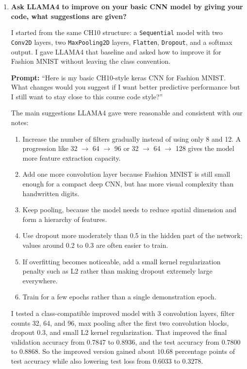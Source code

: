 \documentclass[10pt]{extarticle}
\begin{document}
\begin{enumerate}[label=\arabic*., leftmargin=2em]

\item \textbf{Ask LLAMA4 to improve on your basic CNN model by giving your code, what suggestions are given?}

I started from the same CH10 structure: a \texttt{Sequential} model with two \texttt{Conv2D} layers, two \texttt{MaxPooling2D} layers, \texttt{Flatten}, \texttt{Dropout}, and a softmax output. I gave LLAMA4 that baseline and asked how to improve it for Fashion MNIST without leaving the class convention.

\noindent\textbf{Prompt:} ``Here is my basic CH10-style keras CNN for Fashion MNIST. What changes would you suggest if I want better predictive performance but I still want to stay close to this course code style?''

The main suggestions LLAMA4 gave were reasonable and consistent with our notes:
\begin{enumerate}[label=\alph*., leftmargin=2em]
\item Increase the number of filters gradually instead of using only 8 and 12. A progression like 32 $\rightarrow$ 64 $\rightarrow$ 96 or 32 $\rightarrow$ 64 $\rightarrow$ 128 gives the model more feature extraction capacity.
\item Add one more convolution layer because Fashion MNIST is still small enough for a compact deep CNN, but has more visual complexity than handwritten digits.
\item Keep pooling, because the model needs to reduce spatial dimension and form a hierarchy of features.
\item Use dropout more moderately than 0.5 in the hidden part of the network; values around 0.2 to 0.3 are often easier to train.
\item If overfitting becomes noticeable, add a small kernel regularization penalty such as L2 rather than making dropout extremely large everywhere.
\item Train for a few epochs rather than a single demonstration epoch.
\end{enumerate}

I tested a class-compatible improved model with 3 convolution layers, filter counts 32, 64, and 96, max pooling after the first two convolution blocks, dropout 0.3, and small L2 kernel regularization. That improved the final validation accuracy from $0.7847$ to $0.8936$, and the test accuracy from $0.7800$ to $0.8868$. So the improved version gained about $10.68$ percentage points of test accuracy while also lowering test loss from $0.6033$ to $0.3278$.


\end{enumerate}
\end{document}
